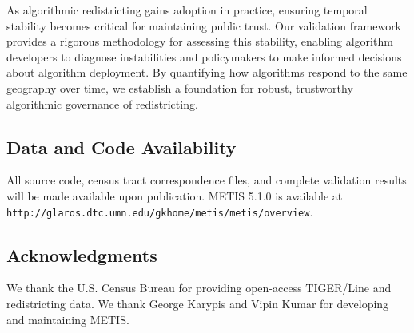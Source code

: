 As algorithmic redistricting gains adoption in practice, ensuring temporal stability becomes critical for maintaining public trust. Our validation framework provides a rigorous methodology for assessing this stability, enabling algorithm developers to diagnose instabilities and policymakers to make informed decisions about algorithm deployment. By quantifying how algorithms respond to the same geography over time, we establish a foundation for robust, trustworthy algorithmic governance of redistricting.

\subsection*{Data and Code Availability}

All source code, census tract correspondence files, and complete validation results will be made available upon publication. METIS 5.1.0 is available at \texttt{http://glaros.dtc.umn.edu/gkhome/metis/metis/overview}.

\subsection*{Acknowledgments}

We thank the U.S. Census Bureau for providing open-access TIGER/Line and redistricting data. We thank George Karypis and Vipin Kumar for developing and maintaining METIS.
